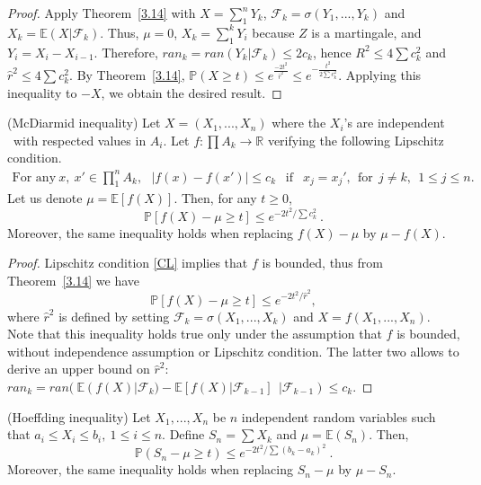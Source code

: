 \begin{proof}
Apply Theorem~\ref{3.14} with $X=\sum_{1}^{n}Y_k$, $\mathcal{F}_k=\sigma(Y_1,...,Y_k)$ and $X_k=\mathbb{E}(X|\mathcal{F}_k)$.
Thus, $\mu=0$, $X_k=\sum_{1}^{k}Y_i $ because $Z$ is a martingale, and $Y_i=X_i-X_{i-1}$.
Therefore, $ran_k=ran(Y_k|\mathcal{F}_k) \leq 2c_k$, hence $R^2 \leq 4 \sum c_k^2$ and $\hat r^2 \leq 4 \sum c_k^2$.
By Theorem~\ref{3.14}, $\mathbb{P}(X \geq t) \leq e^{\frac{-2t^2}{\hat r^2}} \leq e^{-\frac{t^2}{2\sum c_k^2}}.$
Applying this inequality to $-X$, we obtain the desired result. %
\end{proof}

\begin{proposition} ({\sc McDiarmid inequality})
\label{mcdiarmid}
Let $X=(X_1,...,X_n)$ where the $X_i$'s are independent \rv~with respected values in $A_i$.
Let $f : \prod A_k \rightarrow \mathbb{R}$ verifying the following Lipschitz condition.
\begin{align}
\text{For any}~ x,~x' \in \prod_{1}^{n} A_k,~~~ |f(x)-f(x')| \leq c_k ~~\text{ if }~~  x_j = x_j',~~\text{for} ~~j\neq k,~~ 1\le j\le n.
\label{CL}
\end{align} 
Let us denote $\mu=\mathbb{E}\left[f(X)\right]$.
Then, for any $t \geq 0$, %
$$ \mathbb{P}\left[f(X)-\mu \geq t\right] \leq e^{-2t^2/\sum c_k^2}~.$$ Moreover, the same inequality holds when replacing $f(X)-\mu$ by $\mu - f(X)$.
\end{proposition}


\begin{proof} Lipschitz condition \eqref{CL} implies that $f$ is bounded, thus from Theorem~\ref{3.14} we have
$$\mathbb{P}\left[f(X)-\mu \geq t\right] \leq e^{-2t^2/\hat r^2},$$ where $\hat r^2$ is defined by setting $\mathcal{F}_k=\sigma(X_1,...,X_k)$ and $X=f(X_1,...,X_n)$.
Note that this inequality holds true only under the assumption that $f$ is bounded, without independence assumption or Lipschitz condition. The latter two allows to derive an upper bound on $\hat r^2$:
$ran_k=ran(~\mathbb{E}(f(X)|\mathcal{F}_k)-\mathbb{E}\left[f(X)|\mathcal{F}_{k-1}\right]~~|\mathcal{F}_{k-1}) \leq c_k$.
\end{proof}


\begin{proposition} ({\sc Hoeffding inequality})
Let $X_1,...,X_n$ be $n$ independent random variables such that $a_i \leq X_i \leq b_i,~1\le i \le n$. Define $S_n=\sum X_k$ and $\mu=\mathbb{E}(S_n)$.
Then, $$\mathbb{P}(S_n-\mu \geq t) \leq e^{-2t^2/\sum(b_k-a_k)^2} ~.$$ Moreover, the same inequality holds when replacing $S_n-\mu$ by $\mu - S_n$.
\end{proposition}


